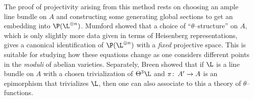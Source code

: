 \begin{remark}
The proof of projectivity arising from this method rests on choosing an ample line bundle on $A$  and constructing some generating global sections to get an embedding into $\P(\L^{\oplus n})$.  Mumford showed that a choice of ``$\theta$--structure'' on $A$, which is only slightly more data given in terms of Heisenberg representations, gives a canonical identification of $\P(\L^{\oplus n})$ with a \emph{fixed} projective space.  This is suitable for studying how these equations change as one considers different points in the \emph{moduli} of abelian varieties.  Separately, Breen showed that if $\L$ is a line bundle on $A$ with a chosen trivialization of $\Theta^3 \L$ and $\pi\colon\thinspace A' \to A$ is an epimorphism that trivializes $\L$, then one can also associate to this a theory of $\theta$--functions.
\end{remark}









